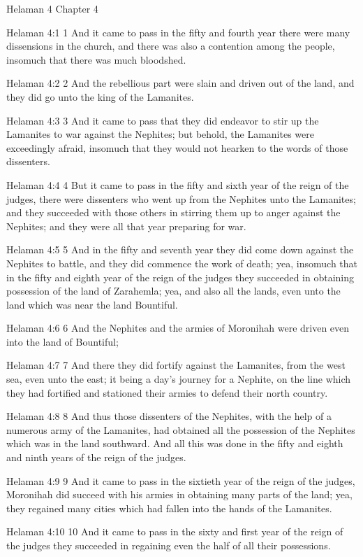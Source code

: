Helaman 4
Chapter 4

Helaman 4:1
 1 And it came to pass in the fifty and fourth year there were
many dissensions in the church, and there was also a contention
among the people, insomuch that there was much bloodshed.

Helaman 4:2
 2 And the rebellious part were slain and driven out of the land,
and they did go unto the king of the Lamanites.

Helaman 4:3
 3 And it came to pass that they did endeavor to stir up the
Lamanites to war against the Nephites; but behold, the Lamanites
were exceedingly afraid, insomuch that they would not hearken to
the words of those dissenters.

Helaman 4:4
 4 But it came to pass in the fifty and sixth year of the reign
of the judges, there were dissenters who went up from the
Nephites unto the Lamanites; and they succeeded with those others
in stirring them up to anger against the Nephites; and they were
all that year preparing for war.

Helaman 4:5
 5 And in the fifty and seventh year they did come down against
the Nephites to battle, and they did commence the work of death;
yea, insomuch that in the fifty and eighth year of the reign of
the judges they succeeded in obtaining possession of the land of
Zarahemla; yea, and also all the lands, even unto the land which
was near the land Bountiful.

Helaman 4:6
 6 And the Nephites and the armies of Moronihah were driven even
into the land of Bountiful;

Helaman 4:7
 7 And there they did fortify against the Lamanites, from the
west sea, even unto the east; it being a day's journey for a
Nephite, on the line which they had fortified and stationed their
armies to defend their north country.

Helaman 4:8
 8 And thus those dissenters of the Nephites, with the help of a
numerous army of the Lamanites, had obtained all the possession
of the Nephites which was in the land southward. And all this
was done in the fifty and eighth and ninth years of the reign of
the judges.

Helaman 4:9
 9 And it came to pass in the sixtieth year of the reign of the
judges, Moronihah did succeed with his armies in obtaining many
parts of the land; yea, they regained many cities which had
fallen into the hands of the Lamanites.

Helaman 4:10
 10 And it came to pass in the sixty and first year of the reign
of the judges they succeeded in regaining even the half of all
their possessions.

